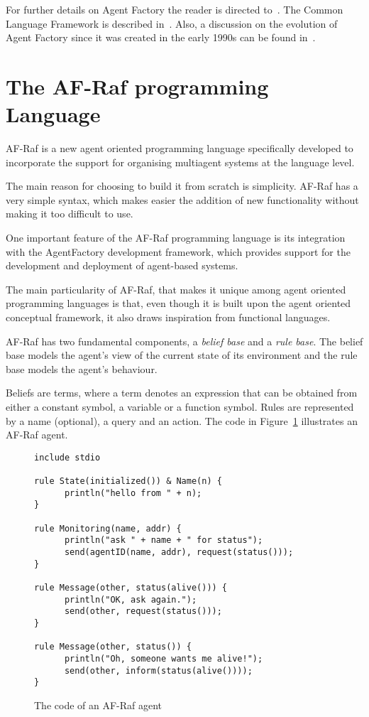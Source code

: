 \documentclass[a4paper,12pt,oneside,fleqn]{book} %
\theoremstyle{plain}
\theoremstyle{definition}
\theoremstyle{remark}
\begin{document}
For further details on Agent Factory the reader is directed
to~\cite{collier2009modeling}. The Common Language Framework is described
in~\cite{russell2011af}. Also, a discussion on the evolution of Agent Factory since it
was created in the early 1990s can be found in~\cite{muldoon2009towards}.



\section{The AF-Raf programming Language} %

AF-Raf is a new agent oriented programming language specifically
developed to incorporate the support for organising multiagent
systems at the language level.

The main reason for choosing to build it from scratch is simplicity.  AF-Raf
has a very simple syntax, which makes easier the addition of new functionality
without making it too difficult to use.

One important feature of the AF-Raf programming language is its integration
with the AgentFactory development framework, which provides support for the
development and deployment of agent-based systems.

The main particularity of AF-Raf, that makes it unique among agent oriented
programming languages is that, even though it is built upon the agent
oriented conceptual framework, it also draws inspiration from functional
languages.

AF-Raf has two fundamental components, a \textit{belief base}
and a \textit{rule base}. The belief base models the agent's view of the
current state of its environment and the rule base models the agent's
behaviour.

Beliefs are terms, where a term denotes an expression that can be obtained from
either a constant symbol, a variable or a function symbol. Rules are
represented by a name (optional), a query and an action.  The code in
Figure~\ref{fig:AF-Raf} illustrates an AF-Raf agent.

\begin{figure}\footnotesize %
\begin{verbatim}
include stdio

rule State(initialized()) & Name(n) {
      println("hello from " + n);
}

rule Monitoring(name, addr) {
      println("ask " + name + " for status");
      send(agentID(name, addr), request(status()));
}

rule Message(other, status(alive())) {
      println("OK, ask again.");
      send(other, request(status()));
}

rule Message(other, status()) {
      println("Oh, someone wants me alive!");
      send(other, inform(status(alive())));
}
\end{verbatim}
\caption{The code of an AF-Raf agent}
\label{fig:AF-Raf}
\end{figure} %
\end{document}
